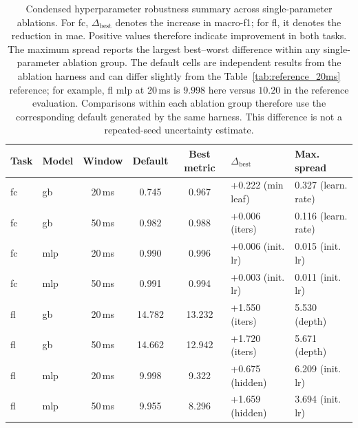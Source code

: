 \begin{table}[ht]
\centering
\footnotesize
\caption{Condensed hyperparameter robustness summary across single-parameter ablations. For \ac{fc}, $\Delta_{\text{best}}$ denotes the increase in macro-\ac{f1}; for \ac{fl}, it denotes the reduction in \ac{mae}. Positive values therefore indicate improvement in both tasks. The maximum spread reports the largest best--worst difference within any single-parameter ablation group. The default cells are independent results from the ablation harness and can differ slightly from the Table~\ref{tab:reference_20ms} reference; for example, \ac{fl} \ac{mlp} at 20\,ms is $9.998$ here versus $10.20$ in the reference evaluation. Comparisons within each ablation group therefore use the corresponding default generated by the same harness. This difference is not a repeated-seed uncertainty estimate.}
\label{tab:ablation_robustness_condensed}
\begin{tabular}{@{}llcccll@{}}
\toprule
\textbf{Task} & \textbf{Model} & \textbf{Window} & \textbf{Default} & \textbf{Best metric} & \textbf{$\Delta_{\text{best}}$} & \textbf{Max. spread} \\
\midrule
\ac{fc} & \ac{gb} & 20\,ms & 0.745 & 0.967 & +0.222 (min leaf) & 0.327 (learn. rate) \\
\ac{fc} & \ac{gb} & 50\,ms & 0.982 & 0.988 & +0.006 (iters) & 0.116 (learn. rate) \\
\ac{fc} & \ac{mlp} & 20\,ms & 0.990 & 0.996 & +0.006 (init. lr) & 0.015 (init. lr) \\
\ac{fc} & \ac{mlp} & 50\,ms & 0.991 & 0.994 & +0.003 (init. lr) & 0.011 (init. lr) \\
\midrule
\ac{fl} & \ac{gb} & 20\,ms & 14.782 & 13.232 & +1.550 (iters) & 5.530 (depth) \\
\ac{fl} & \ac{gb} & 50\,ms & 14.662 & 12.942 & +1.720 (iters) & 5.671 (depth) \\
\ac{fl} & \ac{mlp} & 20\,ms & 9.998 & 9.322 & +0.675 (hidden) & 6.209 (init. lr) \\
\ac{fl} & \ac{mlp} & 50\,ms & 9.955 & 8.296 & +1.659 (hidden) & 3.694 (init. lr) \\
\bottomrule
\end{tabular}
\end{table}
